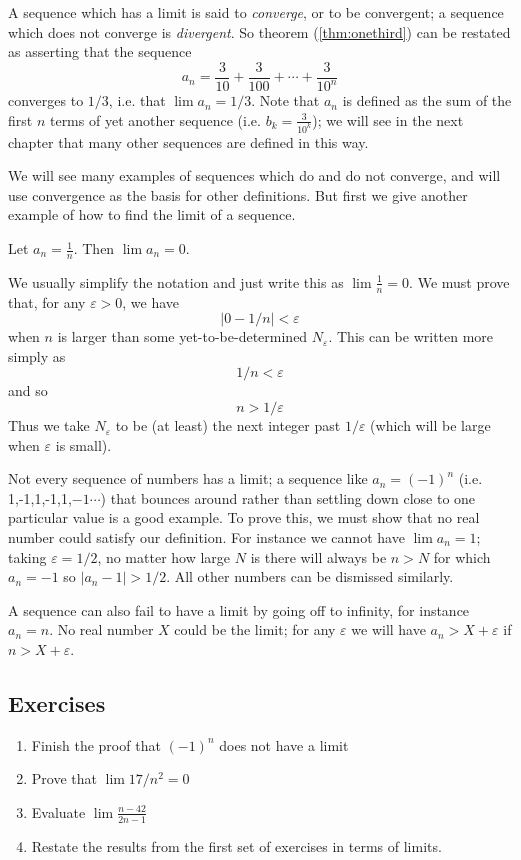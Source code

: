 A sequence which has a limit is said to \emph{converge}, or to be convergent; a sequence which does not converge is \emph{divergent}. So theorem (\ref{thm:onethird}) can be restated as asserting that the sequence
\[
a_n = \frac{3}{10} + \frac{3}{100} + \cdots + \frac{3}{10^n}
\]
converges to $1/3$, i.e. that $\lim a_n = 1/3$.
Note that $a_n$ is defined as the sum of the first $n$ terms of yet another sequence (i.e. $b_k=\frac{3}{10^k}$); we will see in the next chapter that many other sequences are defined in this way.

We will see many examples of sequences which do and do not converge, and will use convergence as the basis for other definitions. But first we give another example of how to find the limit of a sequence.

\begin{thm}\label{thm:oneOverN}
Let $a_n = \frac{1}{n}$. Then
$\lim a_n = 0$.
\end{thm}
We usually simplify the notation and just write this as $\lim \frac{1}{n} = 0$.
We must prove that, for any $\varepsilon > 0$, we have 
\[
|0 - 1/n| < \varepsilon
\]
when $n$ is larger than some yet-to-be-determined $N_\varepsilon$. This can be written more simply as
\[
1/n < \varepsilon
\]
and so 
\[
n > 1/\varepsilon
\]
Thus we take  $N_\varepsilon$ to be (at least) the next integer past $1/\varepsilon$ (which will be large when $\varepsilon$ is small).

Not every sequence of numbers has a limit; a sequence like $a_n=(-1)^n$ (i.e. 1,-1,1,-1,1,$-1\cdots$) that bounces around rather than settling down close to one particular value is a good example.
To prove this, we must show that no real number could satisfy our definition.
For instance we cannot have $\lim a_n =1$; taking $\varepsilon = 1/2$, no matter how large $N$ is there will always be $n>N$ for which $a_n = -1$ so $|a_n - 1| > 1/2$.
All other numbers can be dismissed similarly.%

A sequence can also fail to have a limit by going off to infinity, for instance $a_n=n$. No real number $X$ could be the limit; for any $\varepsilon$ we will have $a_n>X+\varepsilon$ if $n>X+\varepsilon$.

\subsection{Exercises}
\begin{enumerate}
\item Finish the proof that  $(-1)^n$ does not have a limit
\item Prove that $\lim 17/n^2 = 0$
\item Evaluate $\lim \frac{n-42}{2n-1}$
\item Restate the results from the first set of exercises in terms of limits.
\end{enumerate}


